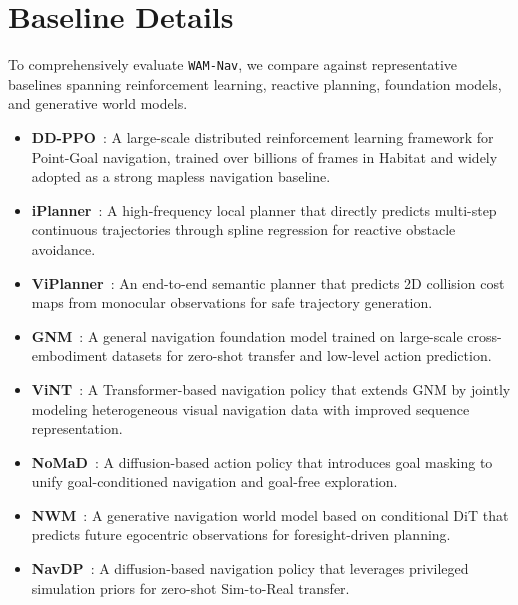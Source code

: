 \documentclass{article}
\begin{document}
\section{Baseline Details}
\label{appendix:baseline_details}
To comprehensively evaluate \texttt{WAM-Nav}, we compare against representative baselines spanning reinforcement learning, reactive planning, foundation models, and generative world models.

\begin{itemize}
    \item \textbf{DD-PPO}~\citep{wijmans2020ddppo}: A large-scale distributed reinforcement learning framework for Point-Goal navigation, trained over billions of frames in Habitat and widely adopted as a strong mapless navigation baseline.

    \item \textbf{iPlanner}~\citep{yang2023iplanner}: A high-frequency local planner that directly predicts multi-step continuous trajectories through spline regression for reactive obstacle avoidance.

    \item \textbf{ViPlanner}~\citep{roth2024viplanner}: An end-to-end semantic planner that predicts 2D collision cost maps from monocular observations for safe trajectory generation.

    \item \textbf{GNM}~\citep{shah2023gnm}: A general navigation foundation model trained on large-scale cross-embodiment datasets for zero-shot transfer and low-level action prediction.

    \item \textbf{ViNT}~\citep{shah2023vint}: A Transformer-based navigation policy that extends GNM by jointly modeling heterogeneous visual navigation data with improved sequence representation.

    \item \textbf{NoMaD}~\citep{sridhar2024nomad}: A diffusion-based action policy that introduces goal masking to unify goal-conditioned navigation and goal-free exploration.

    \item \textbf{NWM}~\citep{bar2025nwm}: A generative navigation world model based on conditional DiT that predicts future egocentric observations for foresight-driven planning.

    \item \textbf{NavDP}~\citep{cai2025navdp}: A diffusion-based navigation policy that leverages privileged simulation priors for zero-shot Sim-to-Real transfer.
\end{itemize}
\end{document}
